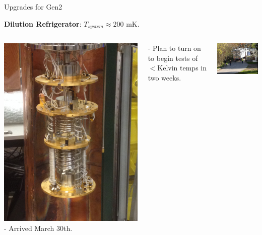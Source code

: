 \documentclass{beamer}
\begin{document}
\begin{frame}{Upgrades for Gen2}

{\color{red} \textbf{\large{Dilution Refrigerator}}}: $T_{system} \approx 200$ mK.
\begin{columns}
\includegraphics[width=\textwidth]{dil_fridge_glamour_shot}
- Arrived March 30th.

- Plan to turn on to begin tests of $<$Kelvin temps in two weeks.\medskip

\includegraphics[width=\textwidth]{semi}

\end{columns}

\end{frame}
\end{document}
